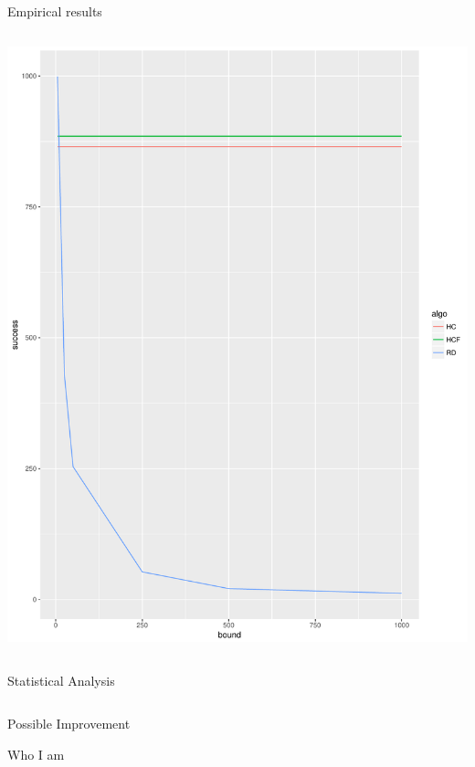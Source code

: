 \documentclass{beamer}
\begin{document}
\begin{frame}{Empirical results}
\begin{columns}
\begin{column}{0.5\textwidth}
\begin{center}
        \includegraphics[scale=0.25]{success_f_bound.pdf}
    \end{center}
\end{column}
\end{columns}
\end{frame}

\begin{frame}{Statistical Analysis}

\begin{columns}
\begin{column}{0.5\textwidth}

\end{column}
\begin{column}{0.5\textwidth}

\end{column}
\end{columns}
\end{frame}

\begin{frame}{Possible Improvement}

\end{frame}

\begin{frame}{Who I am}

\end{frame}
\end{document}
